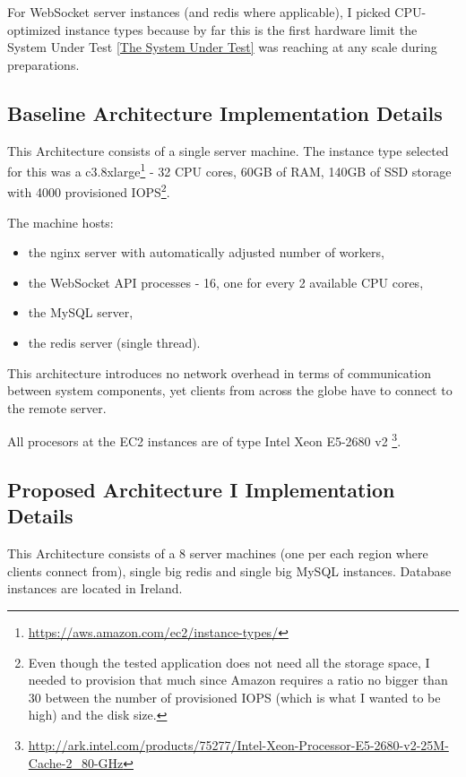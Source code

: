 \documentclass{uvamscse}
\begin{document}
For WebSocket server instances (and redis where applicable), I picked CPU-optimized instance types because by far this is the first hardware limit the System Under Test \ref{The System Under Test} was reaching at any scale during preparations.

\subsection{Baseline Architecture Implementation Details}\label{Baseline Architecture Implementation Details}

This Architecture consists of a single server machine. The instance type selected for this was a c3.8xlarge\footnote{\url{https://aws.amazon.com/ec2/instance-types/}} - 32 CPU cores, 60GB of RAM, 140GB of SSD storage with 4000 provisioned IOPS\footnote{Even though the tested application does not need all the storage space, I needed to provision that much since Amazon requires a ratio no bigger than 30 between the number of provisioned IOPS (which is what I wanted to be high) and the disk size.}.

The machine hosts:
\begin{itemize}
  \item the nginx server with automatically adjusted number of workers,
  \item the WebSocket API processes - 16, one for every 2 available CPU cores,
  \item the MySQL server,
  \item the redis server (single thread).
\end{itemize}

This architecture introduces no network overhead in terms of communication between system components, yet clients from across the globe have to connect to the remote server.

All procesors at the EC2 instances are of type Intel Xeon E5-2680 v2 \footnote{\url{http://ark.intel.com/products/75277/Intel-Xeon-Processor-E5-2680-v2-25M-Cache-2_80-GHz}}.

\subsection{Proposed Architecture I Implementation Details}\label{Proposed Architecture I Implementation Details}

This Architecture consists of a 8 server machines (one per each region where clients connect from), single big redis and single big MySQL instances. Database instances are located in Ireland.
\end{document}
